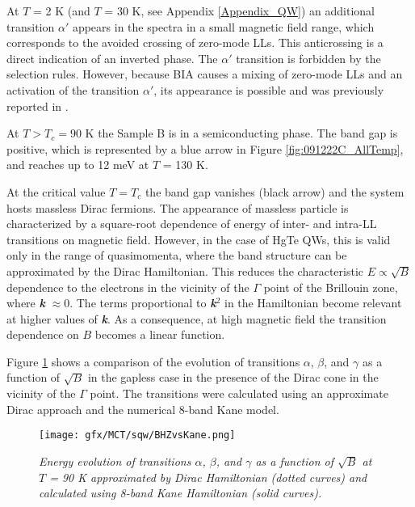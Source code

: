 \documentclass[titlepage,a4paper]{book}
\begin{document}
At $T$ = 2 K (and $T$ = 30 K, see Appendix \ref{Appendix_QW}) an additional transition $\alpha'$ appears in the spectra in a small magnetic field range, which corresponds to the avoided crossing of zero-mode LLs. This anticrossing is a direct indication of an inverted phase. The $\alpha'$ transition is forbidden by the selection rules. However, because BIA causes a mixing of zero-mode LLs and an activation of the transition $\alpha'$, its appearance is possible and was previously reported in \cite{Orlita_MCT_QW}\cite{Zholudev_MCT_QW}\cite{Zholudev_MCT_QW_anticrossing}.

At $T > T_c = 90$ K the Sample B is in a semiconducting phase. The band gap is positive, which is represented by a blue arrow in Figure \ref{fig:091222C_AllTemp}, and reaches up to 12 meV at $T$ = 130 K. 

At the critical value $T = T_c$ the band gap vanishes (black arrow) and the system hosts massless Dirac fermions. The appearance of massless particle is characterized by a square-root dependence of energy of inter- and intra-LL transitions on magnetic field. However, in the case of HgTe QWs, this is valid only in the range of quasimomenta, where the band structure can be approximated by the Dirac Hamiltonian. This reduces the characteristic $E \propto \sqrt{B}$ dependence to the electrons in the vicinity of the $\Gamma$ point of the Brillouin zone, where \textbf{\textit{k}} $\approx 0$. The terms proportional to \textbf{\textit{k}}$^2$ in the Hamiltonian become relevant at higher values of \textbf{\textit{k}}. As a consequence, at high magnetic field the transition dependence on $B$ becomes a linear function. 

Figure \ref{fig:BHZvsKane} shows a comparison of the evolution of transitions $\alpha$, $\beta$, and $\gamma$ as a function of $\sqrt{B}$ in the gapless case in the presence of the Dirac cone in the vicinity of the $\Gamma$ point. The transitions were calculated using an approximate Dirac approach and the numerical 8-band Kane model. 
 

\begin{figure}[ht]
	\centering
	\texttt{[image: gfx/MCT/sqw/BHZvsKane.png]}
	\vspace{-10pt}
	\caption{\textit{Energy evolution of transitions $\alpha$, $\beta$, and $\gamma$ as a function of $\sqrt{B}$ at $T$ = 90 K approximated by Dirac Hamiltonian (dotted curves) and calculated using 8-band Kane Hamiltonian (solid curves).}}
	\label{fig:BHZvsKane}
\end{figure}
\end{document}
